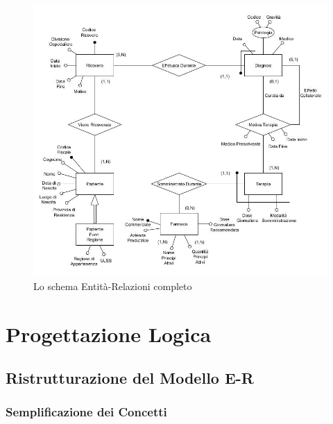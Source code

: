 \documentclass{article}
\begin{document}
\begin{figure} %
    \centering
    \includegraphics[width=\linewidth]{schema1}
    \caption{Lo schema Entità-Relazioni completo}
    \label{schema_ER_progettazione_modello}
  \end{figure}






\clearpage
\section{Progettazione Logica}


\subsection{Ristrutturazione del Modello E-R}
\subsubsection{Semplificazione dei Concetti}
\end{document}
